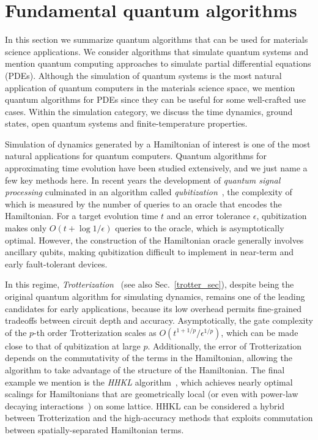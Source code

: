 
\section{Fundamental quantum algorithms}
\label{high_level_algo_summary}

In this section we summarize quantum algorithms that can be used for materials science applications. We consider algorithms that simulate quantum systems and mention quantum computing approaches to simulate partial differential equations (PDEs). Although the simulation of quantum systems is the most natural application of quantum computers in the materials science space, we mention  quantum algorithms for PDEs since they can be useful for some well-crafted use cases. Within the simulation category, we discuss the time dynamics, ground states, open quantum systems and finite-temperature properties. 

Simulation of dynamics generated by a Hamiltonian of interest is one of the most natural applications for quantum computers.
Quantum algorithms for approximating time evolution have been studied extensively, and we just name a few key methods here.
In recent years the development of \emph{quantum signal processing} culminated in an algorithm called \emph{qubitization}~\cite{low2019hamiltonian}, the complexity of which is measured by the number of queries to an oracle that encodes the Hamiltonian.
For a target evolution time $t$ and an error tolerance $\epsilon$, qubitization makes only $O(t + \log 1/\epsilon)$ queries to the oracle, which is asymptotically optimal. However, the construction of the Hamiltonian oracle generally involves ancillary qubits, making qubitization difficult to implement in near-term and early fault-tolerant devices. 

In this regime, \emph{Trotterization}~\cite{lloyd1996universal,childs2019theory} (see also Sec.~\ref{trotter_sec}), despite being the original quantum algorithm for simulating dynamics, remains one of the leading candidates for early applications, because its low overhead permits fine-grained tradeoffs between circuit depth and accuracy.
Asymptotically, the gate complexity of the $p$-th order Trotterization scales as $O(t^{1+1/p}/\epsilon^{1/p})$, which can be made close to that of qubitization at large $p$.
Additionally, the error of Trotterization depends on the commutativity of the terms in the Hamiltonian, allowing the algorithm to take advantage of the structure of the Hamiltonian.
The final example we mention is the \emph{HHKL} algorithm~\cite{hhkl2018}, which achieves nearly optimal scalings for Hamiltonians that are geometrically local (or even with power-law decaying interactions~\cite{tran2019locality}) on some lattice.
HHKL can be considered a hybrid between Trotterization and the high-accuracy methods that exploits commutation between spatially-separated Hamiltonian terms.

